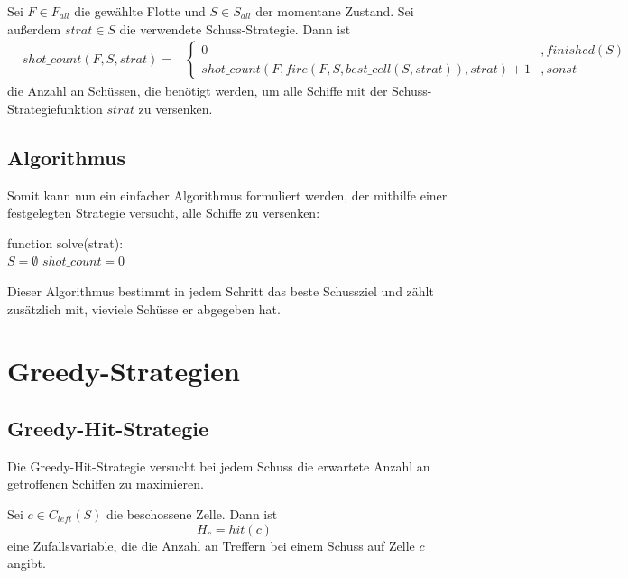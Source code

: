 \documentclass[a4paper,12pt]{llncs}
\numberwithin{equation}{section}
\begin{document}
\begin{definition}
Sei $F\in F_{all}$ die gewählte Flotte und $S\in S_{all}$ der momentane Zustand.
Sei außerdem $strat \in S$ die verwendete Schuss-Strategie.
Dann ist
\begin{align}
&shot\_count(F, S, strat)=
& \begin{cases} 
  	0& ,finished(S) \\
      shot\_count(F, fire(F, S, best\_cell(S, strat)), strat) + 1 & ,sonst
   \end{cases}
\nonumber
\end{align}
die Anzahl an Schüssen, die benötigt werden, um alle Schiffe mit der Schuss-Strategiefunktion $strat$ zu versenken.
\end{definition}

\subsection{Algorithmus}

Somit kann nun ein einfacher Algorithmus formuliert werden, der mithilfe einer festgelegten Strategie versucht, alle Schiffe zu versenken:

\begin{algorithm}[H]
 function solve(strat):\\
 $S=\emptyset$\;
 $shot\_count=0$\;
\end{algorithm}

Dieser Algorithmus bestimmt in jedem Schritt das beste Schussziel und zählt zusätzlich mit, vieviele Schüsse er abgegeben hat.

\section{Greedy-Strategien}

\subsection{Greedy-Hit-Strategie}
Die Greedy-Hit-Strategie versucht bei jedem Schuss die erwartete Anzahl an getroffenen Schiffen zu maximieren.

\begin{definition}
Sei $c \in C_{left}(S)$ die beschossene Zelle.
Dann ist
\[
H_{c}=hit(c)
\]
eine Zufallsvariable, die die Anzahl an Treffern bei einem Schuss auf Zelle $c$ angibt.
\end{definition}
\end{document}

